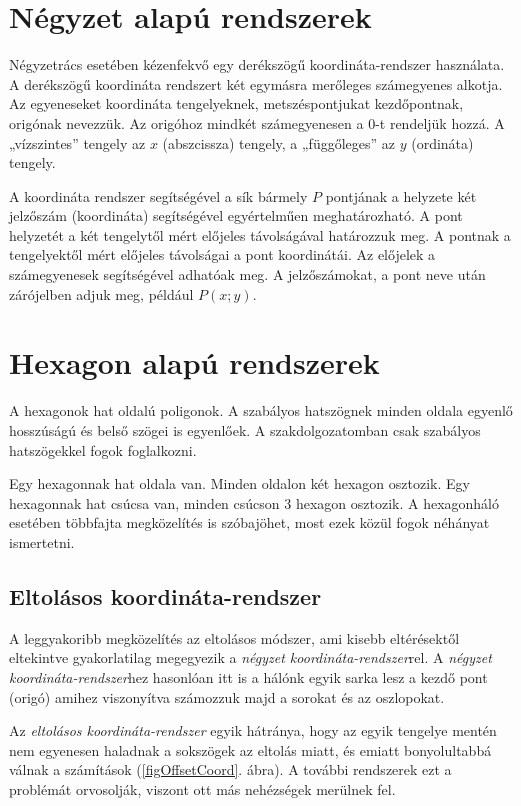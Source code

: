 
\section{Négyzet alapú rendszerek}

Négyzetrács esetében kézenfekvő egy derékszögű koordináta-rendszer használata. A derékszögű koordináta rendszert két egymásra merőleges számegyenes alkotja. Az egyeneseket koordináta tengelyeknek, metszéspontjukat kezdőpontnak, origónak nevezzük. Az origóhoz mindkét számegyenesen a $0$-t rendeljük hozzá. A „vízszintes” tengely az $x$ (abszcissza) tengely, a „függőleges” az $y$ (ordináta) tengely.

A koordináta rendszer segítségével a sík bármely $P$ pontjának a helyzete két jelzőszám (koordináta) segítségével egyértelműen meghatározható. A pont helyzetét a két tengelytől mért előjeles távolságával határozzuk meg. A pontnak a tengelyektől mért előjeles távolságai a pont koordinátái. Az előjelek a számegyenesek segítségével adhatóak meg. A jelzőszámokat, a pont neve után zárójelben adjuk meg, például $P(x; y)$.

\section{Hexagon alapú rendszerek}

A hexagonok hat oldalú poligonok. A szabályos hatszögnek minden oldala egyenlő hosszúságú és belső szögei is egyenlőek. A szakdolgozatomban csak szabályos hatszögekkel fogok foglalkozni. 

Egy hexagonnak hat oldala van. Minden oldalon két hexagon osztozik. Egy hexagonnak hat csúcsa van, minden csúcson 3 hexagon osztozik. A hexagonháló esetében többfajta megközelítés is szóbajöhet, most ezek közül fogok néhányat ismertetni. 

\subsection{Eltolásos koordináta-rendszer}

A leggyakoribb megközelítés az eltolásos módszer, ami kisebb eltérésektől eltekintve gyakorlatilag megegyezik a \textit{négyzet koordináta-rendszer}rel. A \textit{négyzet koordináta-rendszer}hez hasonlóan itt is a hálónk egyik sarka lesz a kezdő pont (origó) amihez viszonyítva számozzuk majd a sorokat és az oszlopokat.

Az \textit{eltolásos koordináta-rendszer} egyik hátránya, hogy az egyik tengelye mentén nem egyenesen haladnak a sokszögek az eltolás miatt, és emiatt bonyolultabbá válnak a számítások (\ref{figOffsetCoord}. ábra). A további rendszerek ezt a problémát orvosolják, viszont ott más nehézségek merülnek fel.	

